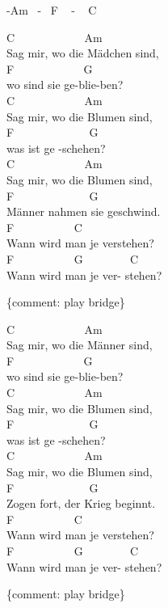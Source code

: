 \documentclass[
  letterpaper,
]{scrbook}
\begin{document}
-Am ~- ~F ~ - ~ C

C ~ ~ ~ ~ ~ ~ ~ Am ~ ~ ~ ~ ~\\
Sag mir, wo die Mädchen sind,\\
F ~ ~ ~ ~ ~ ~ ~ G\\
wo sind sie ge-blie-ben?\\
C ~ ~ ~ ~ ~ ~ ~ Am ~ ~ ~ ~ ~\\
Sag mir, wo die Blumen sind,\\
F ~ ~ ~ ~ ~ ~ ~ ~G\\
was ist ge -schehen?\\
C ~ ~ ~ ~ ~ ~ ~ Am ~ ~ ~ ~ ~\\
Sag mir, wo die Blumen sind,\\
F ~ ~ ~ ~ ~ ~ ~ ~G\\
Männer nahmen sie geschwind.\\
F ~ ~ ~ ~ ~ ~ C ~ ~ ~ ~ ~ ~ ~ ~\\
Wann wird man je verstehen? ~ ~\\
F ~ ~ ~ ~ ~ ~ G ~ ~ ~ ~ ~C\\
Wann wird man je ver- stehen?

\{comment: play bridge\}

C ~ ~ ~ ~ ~ ~ ~ Am ~ ~ ~ ~ ~\\
Sag mir, wo die Männer sind,\\
F ~ ~ ~ ~ ~ ~ ~ G\\
wo sind sie ge-blie-ben?\\
C ~ ~ ~ ~ ~ ~ ~ Am ~ ~ ~ ~ ~\\
Sag mir, wo die Blumen sind,\\
F ~ ~ ~ ~ ~ ~ ~ ~G\\
was ist ge -schehen?\\
C ~ ~ ~ ~ ~ ~ ~ Am ~ ~ ~ ~ ~\\
Sag mir, wo die Blumen sind,\\
F ~ ~ ~ ~ ~ ~ ~ ~G\\
Zogen fort, der Krieg beginnt.\\
F ~ ~ ~ ~ ~ ~ C ~ ~ ~ ~ ~ ~ ~ ~\\
Wann wird man je verstehen? ~ ~\\
F ~ ~ ~ ~ ~ ~ G ~ ~ ~ ~ ~C\\
Wann wird man je ver- stehen?

\{comment: play bridge\}
\end{document}
